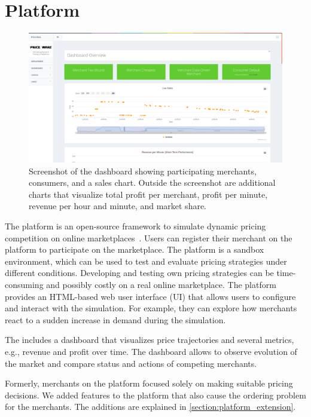 
\chapter{\pricewars Platform}

\begin{figure}[h]
	\centering
	\includegraphics[width=\textwidth]{figures/dashboard}
	\caption[Screenshot of the \pricewars Dashboard]{Screenshot of the \pricewars dashboard showing participating merchants, consumers, and a sales chart. Outside the screenshot are additional charts that visualize total profit per merchant, profit per minute, revenue per hour and minute, and market share.}
	\label{fig:dashboard}
\end{figure}


The \pricewars platform is an open-source framework to simulate dynamic pricing competition on online marketplaces~\cite{DBLP:conf/recsys/0001SPSBLLSU17, edoc2017pricewars}.
Users can register their merchant on the platform to participate on the marketplace.
The platform is a sandbox environment, which can be used to test and evaluate pricing strategies under different conditions.
Developing and testing own pricing strategies can be time-consuming and possibly costly on a real online marketplace.
The platform provides an HTML-based web user interface (UI) that allows users to configure and interact with the simulation.
For example, they can explore how merchants react to a sudden increase in demand during the simulation.

The \ui includes a dashboard that visualizes price trajectories and several metrics, e.g., revenue and profit over time.
The dashboard allows to observe evolution of the market and compare status and actions of competing merchants.

Formerly, merchants on the \pricewars platform focused solely on making suitable pricing decisions.
We added features to the platform that also cause the ordering problem for the merchants.
The additions are explained in \cref{section:platform_extension}. 

